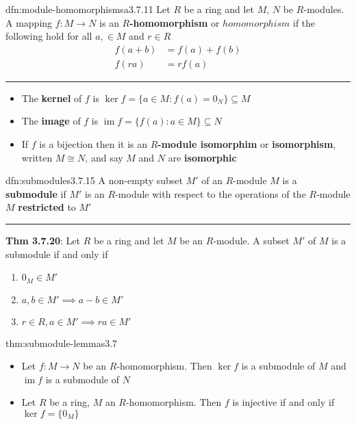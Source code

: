 \documentclass[landscape, 8pt]{extarticle}
\DeclareMathOperator{\im}{im}
\begin{document}
\begin{multicols}{3}
\begin{dfn}{dfn:module-homomorphismsa}{3.7.11}
    Let $R$ be a ring and let $M$, $N$ be $R$-modules. A mapping $f : M\to N$ is an \textbf{$R$-homomorphism} or \textbf{$homomorphism$} if the following hold for all $a,\in M$ and $r\in R$
    \begin{align*}
        f(a + b) &= f(a) + f(b)\\
        f(ra) &= rf(a)
    \end{align*}

    \noindent\rule{\textwidth}{0.2pt}
    \begin{itemize}[leftmargin=*]
        \setlength\itemsep{0em}
        \item The \textbf{kernel} of $f$ is $\ker f = \{a\in M : f(a) = 0_{N}\}\subseteq M$
        \item The \textbf{image} of $f$ is $\im f = \{f(a) : a\in M\}\subseteq N$
        \item If $f$ is a bijection then it is an \textbf{$R$-module isomorphim} or \textbf{isomorphism}, written $M \cong N$, and say $M$ and $N$ are \textbf{isomorphic}
    \end{itemize}

\end{dfn}

\begin{dfn}[Submodules]{dfn:submodules}{3.7.15}
    A non-empty subset $M'$ of an $R$-module $M$ is a \textbf{submodule} if $M'$ is an $R$-module with respect to the operations of the $R$-module $M$ \textbf{restricted} to $M'$

    \noindent\rule{\textwidth}{0.2pt}
    \textbf{Thm 3.7.20}: Let $R$ be a ring and let $M$ be an $R$-module. A subset $M'$ of $M$ is a submodule if and only if
    \begin{enumerate}
        \setlength\itemsep{0em}
        \item $0_{M}\in M'$
        \item $a,b\in M' \implies a - b \in M'$
        \item $r\in R, a\in M' \implies ra\in M'$
    \end{enumerate}
\end{dfn}

\begin{thm}{thm:submodule-lemmas}{3.7}
    \begin{itemize}
        \setlength\itemsep{0em}
        \item[\textbf{3.7.21}] Let $f : M\to N$ be an $R$-homomorphism. Then $\ker f$ is a submodule of $M$ and $\im f$ is a submodule of $N$
        \item[\textbf{2.7.22}] Let $R$ be a ring, $M$ an $R$-homomorphism. Then $f$ is injective if and only if $\ker f = \{0_{M}\}$
    \end{itemize}
\end{thm}


\end{multicols}
\end{document}
